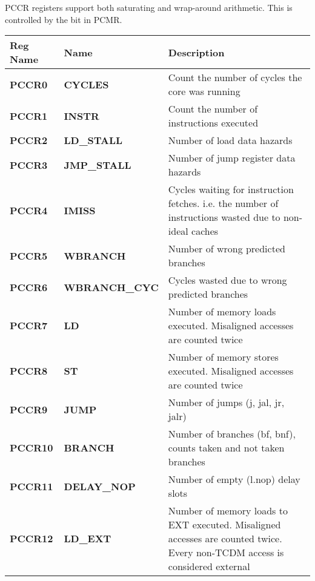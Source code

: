 
PCCR registers support both saturating and wrap-around arithmetic. This is
controlled by the  bit in PCMR.

\begin{table}[H]
\begin{tabularx}{\textwidth}{@{}llX@{}} \toprule
  \textbf{Reg Name} & \textbf{Name}       & Description \\ \toprule
  \textbf{PCCR0}  & \textbf{CYCLES}       & Count the number of cycles the core was running \\ \hline
  \textbf{PCCR1}  & \textbf{INSTR}        & Count the number of instructions executed \\ \hline
  \textbf{PCCR2}  & \textbf{LD\_STALL}    & Number of load data hazards \\ \hline
  \textbf{PCCR3}  & \textbf{JMP\_STALL}   & Number of jump register data hazards \\ \hline
  \textbf{PCCR4}  & \textbf{IMISS}        & Cycles waiting for instruction fetches. i.e. the number of instructions wasted due to non-ideal caches \\ \hline
  \textbf{PCCR5}  & \textbf{WBRANCH}      & Number of wrong predicted branches \\ \hline
  \textbf{PCCR6}  & \textbf{WBRANCH\_CYC} & Cycles wasted due to wrong predicted branches \\ \hline
  \textbf{PCCR7}  & \textbf{LD}           & Number of memory loads executed. Misaligned accesses are counted twice \\ \hline
  \textbf{PCCR8}  & \textbf{ST}           & Number of memory stores executed. Misaligned accesses are counted twice \\ \hline
  \textbf{PCCR9}  & \textbf{JUMP}         & Number of jumps (j, jal, jr, jalr)\\ \hline
  \textbf{PCCR10} & \textbf{BRANCH}       & Number of branches (bf, bnf), counts taken and not taken branches\\ \hline
  \textbf{PCCR11} & \textbf{DELAY\_NOP}   & Number of empty (l.nop) delay slots \\ \hline
  \textbf{PCCR12} & \textbf{LD\_EXT}      & Number of memory loads to EXT executed. Misaligned accesses are counted twice. Every non-TCDM access is considered external \\ \hline

\end{tabularx}
\end{table}
